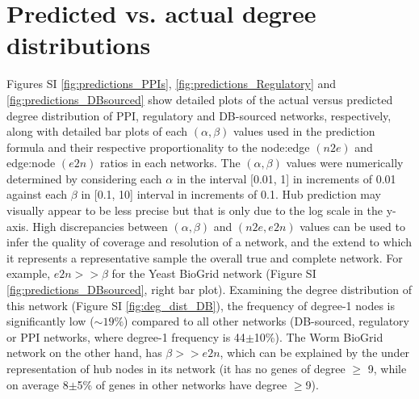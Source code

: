 

\newpage
\section{Predicted vs. actual degree distributions}\label{sup_prediction}

        Figures SI \ref{fig:predictions_PPIs}, \ref{fig:predictions_Regulatory} and \ref{fig:predictions_DBsourced} show detailed plots of the actual versus predicted degree distribution of PPI, regulatory and DB-sourced networks, respectively, along with detailed bar plots of each $(\alpha,\beta)$ values used in the prediction formula and their respective proportionality to the node:edge $(n2e)$
        and edge:node $(e2n)$ ratios in each networks.
        The $(\alpha,\beta)$ values were  numerically determined by considering each $\alpha$ in the interval [0.01, 1] in increments of 0.01 against each $\beta$ in [0.1, 10] interval in increments of 0.1.
        Hub prediction may visually appear  to be less precise but that is only due to the log scale in the y-axis. High discrepancies between $(\alpha,\beta)$ and $(n2e,e2n)$ values can be used to infer the quality of coverage and resolution of a network, and the extend to which it represents a representative sample the overall true and complete network. For example, $e2n >> \beta$ for the Yeast BioGrid network (Figure SI \ref{fig:predictions_DBsourced}, right bar plot). Examining the degree distribution of this network (Figure SI \ref{fig:deg_dist_DB}), the frequency of degree-1 nodes is significantly low (${\sim}19\%$) compared to all other networks (DB-sourced, regulatory or PPI networks, where degree-1 frequency is 44$\pm$10\%). The Worm BioGrid network on the other hand, has $\beta >> e2n$, which can be explained by the under representation of hub nodes in its network (it has no genes of degree $\geq$ 9, while on average 8$\pm$5\% of genes in other networks have degree $\geq$9).

